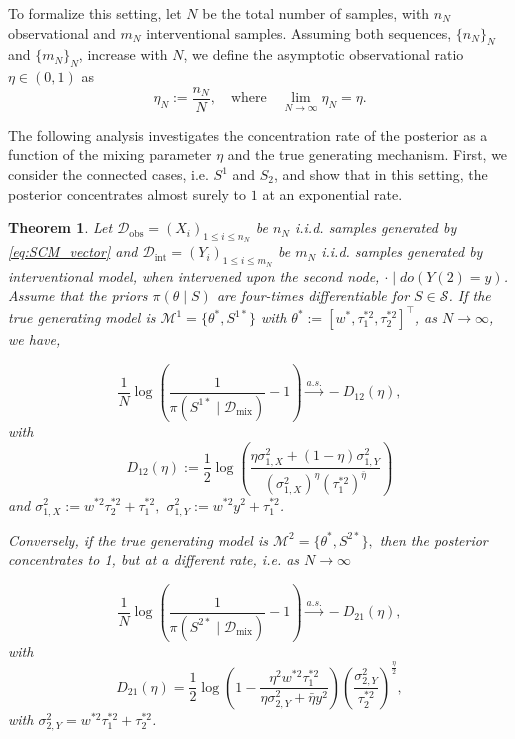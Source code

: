 \documentclass[accepted]{uai2026} %
\newcommand{\train}{\mathcal{D}}
\newcommand{\obsdata}{\train_{\text{obs}}}
\newcommand{\mixdata}{\train_{\text{mix}}}
\newcommand{\tsone}{\tau_1^{*2}}
\newcommand{\tstwo}{\tau_2^{*2}}
\newcommand{\intdata}{\train_{\text{int}}}
\def\transpose{\intercal}
\theoremstyle{boldremark}
\newtheorem{theorem}{Theorem}[section]
\begin{document}
To formalize this setting, let $N$ be the total number of samples, with $n_N$ observational and $m_N$ interventional samples. Assuming both sequences, $\{n_N\}_N$ and $\{m_N\}_N$, increase with $N$, we define the asymptotic observational ratio $\eta \in (0,1)$ as
\begin{equation}
    \label{eq:def_eta}
    \eta_N := \frac{n_N}{N}, \quad \text{where} \quad \lim_{N \to \infty} \eta_N = \eta.
\end{equation}

The following analysis investigates the concentration rate of the posterior as a function of the mixing parameter $\eta$ and the true generating mechanism. First, we consider the connected cases, i.e. $S^1$ and $S_2$, and show that in this setting, the posterior concentrates almost surely to $1$ at an exponential rate. 

\begin{theorem}
    \label{thm:ident_S1}
    Let $\obsdata = (X_i)_{1\leq i \leq n_N}$ be $n_N$ i.i.d. samples generated by \eqref{eq:SCM_vector} and $\intdata = (Y_i)_{1\leq i\leq m_N}$ be $m_N$ i.i.d. samples generated by interventional model, when intervened upon the second node, $\cdot\mid do(Y(2) = y )$. Assume that the priors $\pi(\theta\mid S)$ are four-times differentiable for $S \in \mathcal{S}$. If the true generating model is $\mathcal{M}^1 = \{\theta^*, S^{1*}\}$ with $\theta^*:= [w^*, \tsone, \tstwo]^\transpose$, as $N \to \infty$, we have,

    \[
        \frac{1}{N} \log \left( \frac{1}{\pi(S^{1*} \mid \mixdata)} - 1 \right) \xrightarrow{a.s.} -D_{12}(\eta),
    \]
    with 
\begin{equation}
    \label{eq:D_12_def}
    D_{12}(\eta) := \frac{1}{2} \log \left( \frac{\eta \sigma_{1,X}^2 + (1-\eta) \sigma_{1,Y}^2}{(\sigma_{1,X}^2)^\eta (\tsone)^{\bar{\eta}}} \right)
\end{equation}
    and  $\sigma_{1,X}^2:=w^{*2}\tstwo+\tsone,$ $\sigma_{1, Y}^2 := w^{*2}y^2+\tsone$.

    Conversely, if the true generating model is $\mathcal{M}^2 = \{\theta^*, S^{2*}\}, $ then the posterior concentrates to 1, but at a different rate, i.e. as $N \to \infty$

    \[
        \frac{1}{N} \log \left( \frac{1}{\pi(S^{2*} \mid \mixdata)} - 1 \right) \xrightarrow{a.s.} -D_{21}(\eta),
    \]
    with 
    \begin{equation}
        \label{eq:D_21_def}
        D_{21}(\eta) = \frac{1}{2}\log \left( 1- \frac{\eta^2 w^{*2}\tau_1^{*2}}{\eta\sigma_{2, Y}^2 +\bar{\eta}y^2}\right) \left(\frac{\sigma_{2, Y}^2}{\tau_2^{*2}} \right)^ \frac{\eta}{2},
    \end{equation}
with $\sigma_{2, Y}^2 = w^{*2}\tsone+\tstwo$.
\end{theorem}
\end{document}
